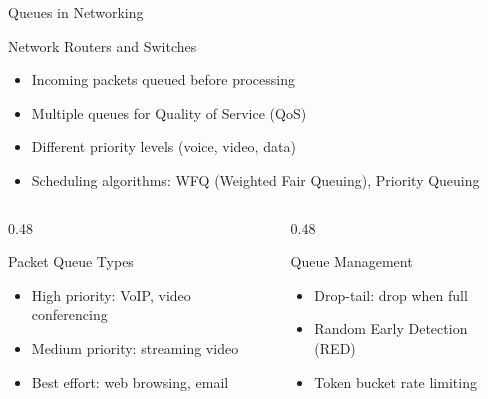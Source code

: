 \documentclass[aspectratio=169,xcolor=dvipsnames]{beamer}
\begin{document}
\begin{frame}{Queues in Networking}
  \begin{block}{Network Routers and Switches}
    \begin{itemize}
      \item Incoming packets queued before processing
      \item Multiple queues for Quality of Service (QoS)
      \item Different priority levels (voice, video, data)
      \item Scheduling algorithms: WFQ (Weighted Fair Queuing), Priority Queuing
    \end{itemize}
  \end{block}

  \vspace{0.3cm}

  \begin{columns}
    \begin{column}{0.48\textwidth}
      \begin{exampleblock}{Packet Queue Types}
        \begin{itemize}
          \item High priority: VoIP, video conferencing
          \item Medium priority: streaming video
          \item Best effort: web browsing, email
        \end{itemize}
      \end{exampleblock}
    \end{column}
    \begin{column}{0.48\textwidth}
      \begin{alertblock}{Queue Management}
        \begin{itemize}
          \item Drop-tail: drop when full
          \item Random Early Detection (RED)
          \item Token bucket rate limiting
        \end{itemize}
      \end{alertblock}
    \end{column}
  \end{columns}
\end{frame}

\end{document}
